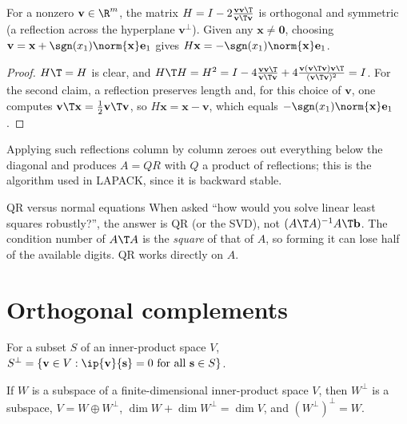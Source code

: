 \begin{theorem}\label{thm:householder}
For a nonzero $\mathbf{v}\in\R^m$, the matrix $H=I-2\frac{\mathbf{v}\mathbf{v}\T}{\mathbf{v}\T\mathbf{v}}$ is orthogonal and symmetric (a reflection across the hyperplane $\mathbf{v}^\perp$). Given any $\mathbf{x}\ne\mathbf{0}$, choosing $\mathbf{v}=\mathbf{x}+\sgn(x_1)\norm{\mathbf{x}}\mathbf{e}_1$ gives $H\mathbf{x}=-\sgn(x_1)\norm{\mathbf{x}}\mathbf{e}_1$.
\end{theorem}

\begin{proof}
$H\T=H$ is clear, and $H\T H=H^2=I-4\frac{\mathbf{v}\mathbf{v}\T}{\mathbf{v}\T\mathbf{v}}+4\frac{\mathbf{v}(\mathbf{v}\T\mathbf{v})\mathbf{v}\T}{(\mathbf{v}\T\mathbf{v})^2}=I$. For the second claim, a reflection preserves length and, for this choice of $\mathbf{v}$, one computes $\mathbf{v}\T\mathbf{x}=\tfrac12\mathbf{v}\T\mathbf{v}$, so $H\mathbf{x}=\mathbf{x}-\mathbf{v}$, which equals $-\sgn(x_1)\norm{\mathbf{x}}\mathbf{e}_1$.
\end{proof}

Applying such reflections column by column zeroes out everything below the diagonal and produces $A=QR$ with $Q$ a product of reflections; this is the algorithm used in LAPACK, since it is backward stable.

\begin{interview}{QR versus normal equations}
When asked ``how would you solve linear least squares robustly?'', the answer is QR (or the SVD), not $(A\T A)^{-1}A\T\mathbf{b}$. The condition number of $A\T A$ is the \emph{square} of that of $A$, so forming it can lose half of the available digits. QR works directly on $A$.
\end{interview}

\section{Orthogonal complements}

\begin{definition}
For a subset $S$ of an inner-product space $V$, $S^\perp=\{\mathbf{v}\in V:\ip{\mathbf{v}}{\mathbf{s}}=0\ \text{for all }\mathbf{s}\in S\}$.
\end{definition}

\begin{theorem}\label{thm:perp}
If $W$ is a subspace of a finite-dimensional inner-product space $V$, then $W^\perp$ is a subspace, $V=W\oplus W^\perp$, $\dim W+\dim W^\perp=\dim V$, and $(W^\perp)^\perp=W$.
\end{theorem}

